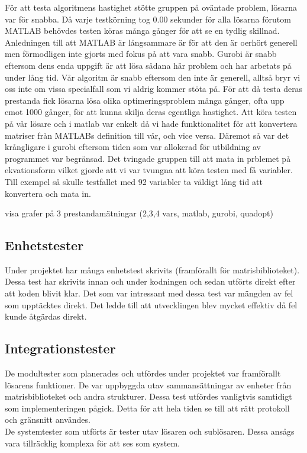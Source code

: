 	För att testa algoritmens hastighet stötte gruppen på oväntade problem, lösarna var för snabba.	Då varje testkörning tog 0.00 sekunder för alla lösarna förutom MATLAB behövdes testen köras många gånger för att se en tydlig skillnad. Anledningen till att MATLAB är långsammare är för att den är oerhört generell men förmodligen inte gjorts med fokus på att vara snabb. Gurobi är snabb eftersom dens enda uppgift är att lösa sådana här problem och har arbetats på under lång tid. Vår algoritm är snabb eftersom den inte är generell, alltså bryr vi oss inte om vissa specialfall som vi aldrig kommer stöta på. \newline
	För att då testa deras prestanda fick lösarna lösa olika optimeringsproblem många gånger, ofta upp emot 1000 gånger, för att kunna skilja deras egentliga hastighet. Att köra testen på vår lösare och i matlab var enkelt då vi hade funktionalitet för att konvertera matriser från MATLABs definition till vår, och vice versa. Däremot så var det krångligare i gurobi eftersom tiden som var allokerad för utbildning av programmet var begränsad. Det tvingade gruppen till att mata in prblemet på ekvationsform vilket gjorde att vi var tvungna att köra testen med få variabler. Till exempel så skulle testfallet med 92 variabler ta väldigt lång tid att konvertera och mata in. \newline

	visa grafer på 3 prestandamätningar (2,3,4 vars, matlab, gurobi, quadopt) 	
	
	\subsection{Enhetstester}
	Under projektet har många enhetstest skrivits (framförallt för matrisbiblioteket). Dessa test har skrivits innan och under kodningen och sedan utförts direkt efter att koden blivit klar. Det som var intressant med dessa test var mängden av fel som upptäcktes direkt. Det ledde till att utvecklingen blev mycket effektiv då fel kunde åtgärdas direkt.
	
	\subsection{Integrationstester}
	De modultester som planerades och utfördes under projektet var framförallt lösarens funktioner. De var uppbyggda utav sammansättningar av enheter från matrisbiblioteket och andra strukturer. Dessa test utfördes vanligtvis samtidigt som implementeringen pågick. Detta för att hela tiden se till att rätt protokoll och gränsnitt användes.\\
De systemtester som utförts är tester utav lösaren och sublösaren. Dessa ansågs vara tillräcklig komplexa för att ses som system. 
	
